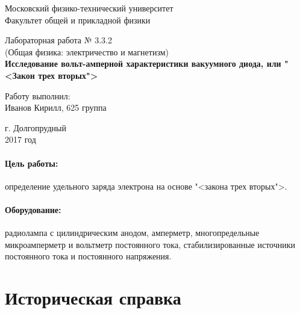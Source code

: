 \documentclass[12pt]{kiarticle}
\begin{document}
\begin{titlepage}
	\begin{center}
		\large 	Московский физико-технический университет \\
		Факультет общей и прикладной физики \\
		\vspace{0.2cm}
		
		\vspace{4.5cm}
		Лабораторная работа № 3.3.2 \\ \vspace{0.2cm}
		\large (Общая физика: электричество и магнетизм) \\ \vspace{0.2cm}
		\LARGE \textbf{Исследование вольт-амперной характеристики вакуумного диода, или "<Закон трех вторых">}
	\end{center}
	\vspace{2.3cm} \large
	
	\begin{center}
		Работу выполнил: \\
		Иванов Кирилл,
		625 группа
		\vspace{10mm}
		
	
		
		
	\end{center}
	
	\begin{center} \vspace{60mm}
		г. Долгопрудный \\
		 2017 год
	\end{center}
\end{titlepage}




\paragraph*{Цель работы:} определение удельного заряда электрона на основе "<закона трех вторых">.

\paragraph*{Оборудование:} радиолампа с цилиндрическим анодом, амперметр, многопредельные микроамперметр и вольтметр постоянного тока, стабилизированные источники постоянного тока и постоянного напряжения.


\section{Историческая справка}
\end{document}
